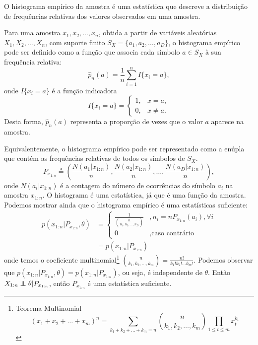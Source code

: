 O histograma empírico da amostra é uma estatística que descreve a distribuição de frequências relativas dos valores observados em uma amostra. 
\begin{definition}
  Para uma amostra $x_1,x_2,\ldots,x_n$, obtida a partir de variáveis aleatórias $X_1,X_2,\ldots,X_n$,
  com suporte finito $S_X = \{a_1,a_2,\ldots,a_D\}$, o histograma empírico pode ser definido como a
  função que associa cada símbolo $a \in S_X$ à sua frequência relativa:
  \begin{equation}
  \hat{p}_n(a) = \frac{1}{n} \sum_{i=1}^n I\{ x_i = a \} ,
  \end{equation}
  onde $I\{ x_i = a \}$ é a função indicadora
  \begin{equation}
    I\{ x_i = a \} = \begin{cases}
      1, & x = a,\\
      0, & x\neq a. 
    \end{cases}
  \end{equation}
  Desta forma, $\hat{p}_n(a)$ representa a proporção de vezes que o valor $a$ aparece na amostra.
\end{definition}
Equivalentemente, o histograma empírico pode ser representado como a enúpla que contém as frequências relativas de todos os símbolos de $S_X$.
\begin{equation}
P_{x_{1:n}} \triangleq \left( \frac{N(a_1|x_{1:n})}{n} , \frac{N(a_2|x_{1:n})}{n} , \ldots , \frac{N(a_D|x_{1:n})}{n} \right) ,
\end{equation}
onde $N(a_i|x_{1:n})$ é a contagem do número de ocorrências do símbolo $a_i$ na amostra $x_{1:n}$.
O histograma é uma estatística, já que é uma função da amostra. Podemos mostrar ainda que
o histograma empírico é uma estatísticas suficiente:
\begin{subequations}
  \begin{align}
    p(x_{1:n}|P_{x_{1:n}},\theta) &=
                \begin{cases}
                \frac{1}{{n \choose {n_1, n_2, \ldots, n_D}}} & , n_i = n P_{x_{1:n}}(a_i), \forall i \\
                0       & , \text{caso contrário}
                \end{cases} \\
                &= p(x_{1:n} \vert P_{x_{1:n}})
  \end{align}
\end{subequations}
onde temos o coeficiente multinomial\footnote{
  Teorema Multinomial
        \begin{equation}
        (x_1 + x_2 + \ldots + x_m)^n = \sum_{k_1 + k_2 + \ldots + k_m = n} {n \choose {k_1, k_2, \ldots, k_m}} \prod_{1 \leq t \leq m} x_t^{k_t}
        \end{equation}
}
${n \choose {k_1, k_2, \ldots, k_m}} = \frac{n!}{k_1! k_2! \ldots k_m!}$.
Podemos observar que $p(x_{1:n}|P_{x_{1:n}},\theta) = p(x_{1:n}|P_{x_{1:n}})$, ou seja,
é independente de $\theta$.
Então $X_{1:n} \independent \theta \vert P_{x_{1:n}}$, então $P_{x_{1:n}}$ é uma estatística suficiente.






